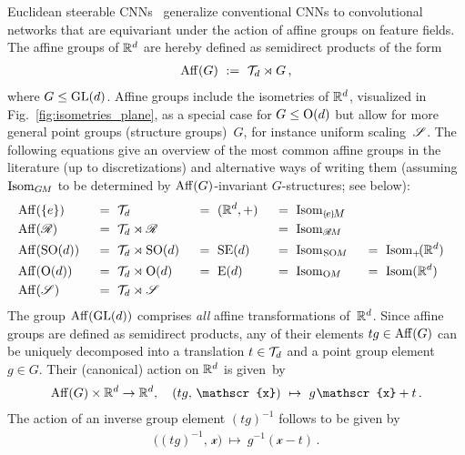 Euclidean steerable CNNs~\cite{Cohen2017-STEER,3d_steerableCNNs,Weiler2019_E2CNN} generalize conventional CNNs to convolutional networks that are equivariant under the action of affine groups on feature fields.
The affine groups of $\mathbb{R}^d$ are hereby defined as semidirect products of the form
\begin{align}\label{eq:AffG_def}
    \operatorname{Aff}(G)\ :=\ \mathcal{T}_d \rtimes G \,,
\end{align}
where $G\leq\operatorname{GL}(d)$.
Affine groups include the isometries of $\mathbb{R}^d$, visualized in Fig.~\ref{fig:isometries_plane}, as a special case for $G\leq\operatorname{O}(d)$ but allow for more general point groups (structure groups)~$G$, for instance uniform scaling~$\mathscr{S}$.
The following equations give an overview of the most common affine groups in the literature (up to discretizations) and alternative ways of writing them (assuming $\operatorname{Isom}_{G\mkern-1.4muM}$ to be determined by $\operatorname{Aff}(G)$-invariant $G$-structures; see below):
\begin{alignat}{5}
    &\Aff(\{e\}) \ &&=\ \Trans_d                \ &&=\ (\R^d,+)\ &&=\ \IsomeM \notag \\
    &\Aff(\Flip) \ &&=\ \Trans_d \rtimes \Flip    &&           \ &&=\ \IsomRM \notag \\
    &\Aff(\SO{d})\ &&=\ \Trans_d \rtimes \SO{d} \ &&=\ \SE{d}  \ &&=\ \IsomSOM\ &&=\ \Isom_+\!(\R^d) \\
    &\Aff(\O{d}) \ &&=\ \Trans_d \rtimes \O{d}  \ &&=\  \E{d}  \ &&=\ \IsomOM \ &&=\ \Isom(\R^d) \notag \\
    &\Aff(\Scale)\ &&=\ \Trans_d \rtimes \Scale \notag
\end{alignat}
The group $\operatorname{Aff}(\operatorname{GL}(d))$ comprises \emph{all} affine transformations of~$\mathbb{R}^d$.
Since affine groups are defined as semidirect products, any of their elements $tg \in \operatorname{Aff}(G)$ can be uniquely decomposed into a translation $t\in \mathcal{T}_d$ and a point group element $g\in G$.
Their (canonical) action on $\mathbb{R}^d$ is given~by
\begin{align}
    \Aff(G)\times\R^d \to \R^d, \quad (tg,\, \mathscr{x})\ \mapsto\ g\mkern1mu \mathscr{x} + t \,.
\end{align}
The action of an inverse group element $(tg)^{-1}$ follows to be given by
\begin{align}
    \big( (tg)^{-1},\, \mathscr{x}\big)\ \mapsto\ g^{-1} (\mathscr{x} - t) \,.
\end{align}


